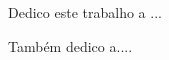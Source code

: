
\chapter*{}
\vspace{15cm}
\begin{flushright}
	Dedico este trabalho a ...
\end{flushright}
\begin{flushright}
	Também dedico a....
\end{flushright}
